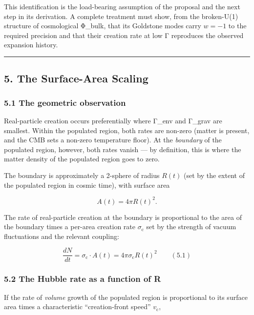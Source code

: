 \documentclass[
]{article}
\begin{document}
This identification is the load-bearing assumption of the proposal and
the next step in its derivation. A complete treatment must show, from
the broken-U(1) structure of cosmological Φ\_bulk, that its Goldstone
modes carry \(w = -1\) to the required precision and that their creation
rate at low Γ reproduces the observed expansion history.

\begin{center}\rule{0.5\linewidth}{0.5pt}\end{center}

\subsection{5. The Surface-Area Scaling}\label{the-surface-area-scaling}

\subsubsection{5.1 The geometric
observation}\label{the-geometric-observation}

Real-particle creation occurs preferentially where Γ\_env and Γ\_grav
are smallest. Within the populated region, both rates are non-zero
(matter is present, and the CMB sets a non-zero temperature floor). At
the \emph{boundary} of the populated region, however, both rates vanish
--- by definition, this is where the matter density of the populated
region goes to zero.

The boundary is approximately a 2-sphere of radius \(R(t)\) (set by the
extent of the populated region in cosmic time), with surface area

\[A(t) = 4 \pi R(t)^2.\]

The rate of real-particle creation at the boundary is proportional to
the area of the boundary times a per-area creation rate
\(\sigma_{\text{c}}\) set by the strength of vacuum fluctuations and the
relevant coupling:

\[\frac{dN}{dt} = \sigma_{\text{c}} \cdot A(t) = 4 \pi \sigma_{\text{c}} R(t)^2 \qquad (5.1)\]

\subsubsection{5.2 The Hubble rate as a function of
R}\label{the-hubble-rate-as-a-function-of-r}

If the rate of \emph{volume} growth of the populated region is
proportional to its surface area times a characteristic ``creation-front
speed'' \(v_{\text{c}}\),
\end{document}
